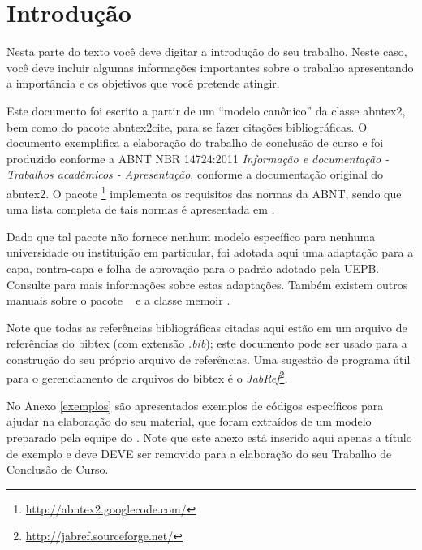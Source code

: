 \documentclass[12pt,oneside,a4paper,chapter=TITLE,
			   english,brazil]{abntex2}
\begin{document}
\tableofcontents*
\cleardoublepage


\textual


\chapter{Introdução}
\label{introducao}

Nesta parte do texto você deve digitar a introdução do seu trabalho. Neste caso, você deve incluir algumas informações importantes sobre o trabalho apresentando a importância e os objetivos que você pretende atingir.

Este documento foi escrito a partir de um ``modelo canônico'' da classe \textsf{abntex2}, bem como do pacote \textsf{abntex2cite}, para se fazer citações bibliográficas. O documento exemplifica a elaboração do trabalho de conclusão de curso e foi produzido conforme a ABNT NBR 14724:2011 \emph{Informação e documentação - Trabalhos acadêmicos - Apresentação}, conforme a documentação original do \textsf{abntex2}. O pacote \abnTeX\footnote{\url{http://abntex2.googlecode.com/}} implementa os requisitos das normas da ABNT, sendo que uma lista completa de tais normas é apresentada em .

Dado que tal pacote não fornece nenhum modelo específico para nenhuma universidade ou instituição em particular, foi adotada aqui uma adaptação para a capa, contra-capa e folha de aprovação para o padrão adotado pela UEPB. Consulte  para mais informações sobre estas adaptações. Também existem outros manuais sobre o pacote \abnTeX\ \cite{abntex2classe,abntex2cite,abntex2cite-alf} e a classe \textsf{memoir} \cite{memoir}.

Note que todas as referências bibliográficas citadas aqui estão em um arquivo de referências do \textsf{bibtex} (com extensão \textit{.bib}); este documento pode ser usado para a construção do seu próprio arquivo de referências. Uma sugestão de programa útil para  o gerenciamento de arquivos do \textsf{bibtex} é o \textit{JabRef}\footnote{\url{http://jabref.sourceforge.net/}}.

No Anexo \ref{exemplos} são apresentados exemplos de códigos específicos para ajudar na elaboração do seu material, que foram extraídos de um modelo preparado pela equipe do \abnTeX. Note que este anexo está inserido aqui apenas a título de exemplo e deve DEVE ser removido para a elaboração do seu Trabalho de Conclusão de Curso.
\end{document}
